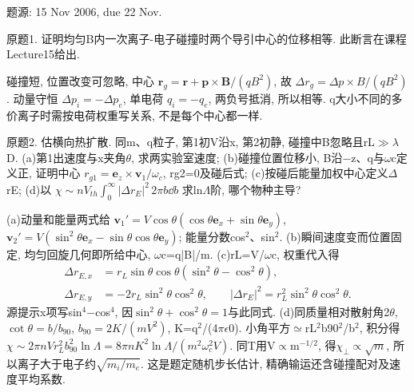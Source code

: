 题源: 15 Nov 2006, due 22 Nov.
\begin{exercise}\label{ex:06-7-1}
原题1. 证明均匀B内一次离子-电子碰撞时两个导引中心的位移相等. 此断言在课程Lecture15给出.
\end{exercise}
\begin{solution}
碰撞短, 位置改变可忽略, 中心 $\mathbf r_g=\mathbf r+\mathbf p\times\mathbf B/(qB^2)$, 故 $\Delta r_g=\Delta p\times B/(qB^2)$. 动量守恒 $\Delta p_i=-\Delta p_e$, 单电荷 $q_i=-q_e$, 两负号抵消, 所以相等. q大小不同的多价离子时需按电荷权重写关系, 不是每个中心都一样.
\end{solution}
\begin{exercise}\label{ex:06-7-2}
原题2. 估横向热扩散. 同m、q粒子, 第1初V沿x, 第2初静, 碰撞中B忽略且rL\ensuremath{\gg}\ensuremath{\lambda}D. (a)第1出速度与x夹角\ensuremath{\theta}, 求两实验室速度; (b)碰撞位置位移小, B沿\ensuremath{-}z、q与\ensuremath{\omega}c定义正, 证明中心 $r_{g1}=\mathbf e_z\times\mathbf v_1/\omega_c$, rg2=0及碰后式; (c)按碰后能量加权中心定义\ensuremath{\Delta}rE; (d)以 $\chi\sim nV_{th}\int_0^\infty|\Delta r_E|^2\,2\pi b\dd b$ 求ln\ensuremath{\Lambda}阶, 哪个物种主导?
\end{exercise}
\begin{solution}
(a)动量和能量两式给 $\mathbf v_1'=V\cos\theta(\cos\theta\mathbf e_x+\sin\theta\mathbf e_y)$, $\mathbf v_2'=V(\sin^2\theta\mathbf e_x-\sin\theta\cos\theta\mathbf e_y)$; 能量分数cos\ensuremath{{}^{2}}、sin\ensuremath{{}^{2}}. (b)瞬间速度变而位置固定, 均匀回旋几何即所给中心, \ensuremath{\omega}c=q|B|/m.
(c)rL=V/\ensuremath{\omega}c, 权重代入得
\begin{align}
 \Delta r_{E,x}&=r_L\sin\theta\cos\theta(\sin^2\theta-\cos^2\theta),\\
 \Delta r_{E,y}&=-2r_L\sin^2\theta\cos^2\theta,\qquad
 |\Delta r_E|^2=r_L^2\sin^2\theta\cos^2\theta.
\end{align}
源提示x项写sin\ensuremath{{}^{4}}\ensuremath{-}cos\ensuremath{{}^{4}}, 因$\sin^2\theta+\cos^2\theta=1$与此同式. (d)同质量相对散射角2\ensuremath{\theta}, $\cot\theta=b/b_{90}$, $b_{90}=2K/(mV^2)$, K=q\ensuremath{{}^{2}}/(4\ensuremath{\pi}\ensuremath{\epsilon}0). 小角平方\ensuremath{\simeq}rL\ensuremath{{}^{2}}b90\ensuremath{{}^{2}}/b\ensuremath{{}^{2}}, 积分得
$\chi\sim2\pi nVr_L^2b_{90}^2\ln\Lambda=8\pi nK^2\ln\Lambda/(m^2\omega_c^2V)$.
同T用V\ensuremath{\propto}m$^{-1/2}$, 得$\chi_\perp\propto\sqrt m$, 所以离子大于电子约$\sqrt{m_i/m_e}$. 这是题定随机步长估计, 精确输运还含碰撞配对及速度平均系数.
\end{solution}
